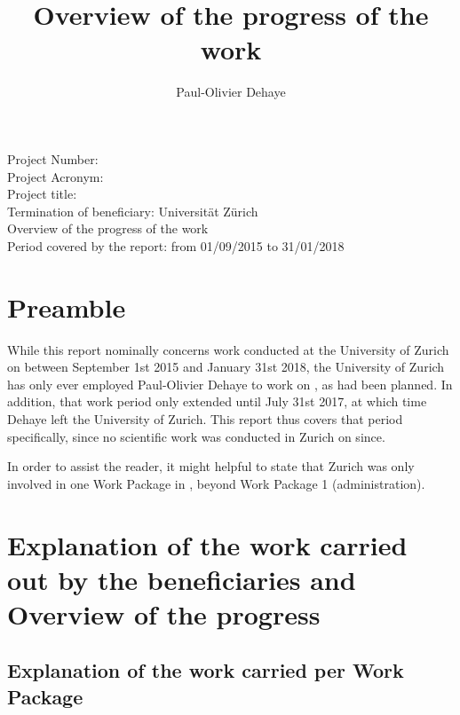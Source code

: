 \documentclass{deliverablereport}
\title{Overview of the progress of the work}
\author{Paul-Olivier Dehaye}
\newcommand{\university}{Universit\"{a}t Z\"{u}rich}
\begin{document}
\begin{center}
\makeatletter
Project Number: \prop@gen@proposalnumber\\[1cm]
Project Acronym: \prop@gen@acronym\\[1cm]
Project title: \prop@gen@title\\[4cm]

Termination of beneficiary: \university\\[1cm]
Overview of the progress of the work \\[4cm]

Period covered by the report: from 01/09/2015 to 31/01/2018
\makeatother
\end{center}
\newpage

\oldmaketitle
\tableofcontents\newpage

\section{Preamble}
While this report nominally concerns work conducted at the University of Zurich on \ODK between September 1st 2015 and January 31st 2018, the University of Zurich has only ever employed Paul-Olivier Dehaye to work on \ODK, as had been planned. In addition, that work period only extended until July 31st 2017, at which time Dehaye left the University of Zurich. This report thus covers that period specifically, since no scientific work was conducted in Zurich on \ODK since.

In order to assist the reader, it might helpful to state that Zurich was only involved in one Work Package in \ODK, beyond Work Package 1 (administration). 

\section{Explanation of the work carried out by the beneficiaries and Overview of the progress}


\subsection{Explanation of the work carried per Work Package}

\end{document}
